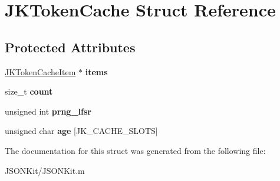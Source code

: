 \hypertarget{struct_j_k_token_cache}{\section{J\+K\+Token\+Cache Struct Reference}
\label{struct_j_k_token_cache}
}
\subsection*{Protected Attributes}
\begin{DoxyCompactItemize}
\item 
\hypertarget{struct_j_k_token_cache_a80b3a1d112b7d798309a71ae3335ab9e}{\hyperlink{struct_j_k_token_cache_item}{J\+K\+Token\+Cache\+Item} $\ast$ {\bfseries items}}\label{struct_j_k_token_cache_a80b3a1d112b7d798309a71ae3335ab9e}

\item 
\hypertarget{struct_j_k_token_cache_a064f4270180ca06ecb5aa14d3b47f2d1}{size\+\_\+t {\bfseries count}}\label{struct_j_k_token_cache_a064f4270180ca06ecb5aa14d3b47f2d1}

\item 
\hypertarget{struct_j_k_token_cache_a02ed24d19e7b1f837d57a4847acee4bb}{unsigned int {\bfseries prng\+\_\+lfsr}}\label{struct_j_k_token_cache_a02ed24d19e7b1f837d57a4847acee4bb}

\item 
\hypertarget{struct_j_k_token_cache_a2cb844821594c94a3d1cd512faa9d66e}{unsigned char {\bfseries age} \mbox{[}J\+K\+\_\+\+C\+A\+C\+H\+E\+\_\+\+S\+L\+O\+T\+S\mbox{]}}\label{struct_j_k_token_cache_a2cb844821594c94a3d1cd512faa9d66e}

\end{DoxyCompactItemize}


The documentation for this struct was generated from the following file\+:\begin{DoxyCompactItemize}
\item 
J\+S\+O\+N\+Kit/J\+S\+O\+N\+Kit.\+m\end{DoxyCompactItemize}
